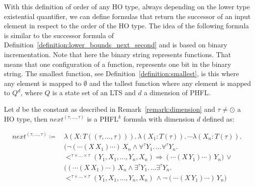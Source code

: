 With this definition of order of any HO type, always depending on the lower type existential quantifier, we can define
formulas that return the successor of an input element in respect to the order of the HO type. The idea of the
following formula is similar to the successor formula of Definition~\ref{definition:lower_bounds_next_second} and is
based on binary incrementation. Note that here the binary string represents functions. That means that one configuration of a function, represents one bit in the binary string. The smallest function, see Definition~\ref{definition:smallest}, is this where any element is mapped to $\emptyset$ and the tallest function where any element is mapped to $Q^d$, where $Q$ is a state set of an LTS and $d$ a dimension of PHFL. 

\begin{definition}
    \label{definition:lower_bounds_next_higher}
    Let $d$ be the constant as described in Remark~\ref{remark:dimension} and $\tau \neq \odot$ a
    HO type, then $next^{(\tau, \dots, \tau)}$ is a PHFL$^k$ formula with dimension $d$ defined as:

    \begin{align*}
        next^{(\tau, \dots, \tau)} \coloneqq &\,\lambda (X \colon T ((\tau, \dots, \tau))).\,\lambda (X_1 \colon T(\tau)).\, \dotsb \lambda (X_n \colon T(\tau)).\, \\&\,
        \big(\neg (\dotsb(X\,X_1)\dotsb)\,X_n \wedge \forall^{\tau}Y_1.\, \dots \forall^{\tau}Y_n.\,\\&\,<^{\tau \times
        \dots \times \tau}(Y_1, X_1, \dots, Y_n, X_n) \Rightarrow  (\dotsb(X\,Y_1)\dotsb)\,Y_n\big) \,\vee
        \\&\,\big((\dotsb (X\,X_1) \dotsb)\,X_n \wedge \exists^{\tau}Y_1.\, \dots \exists^{\tau}Y_n.\, \\&\,
        <^{\tau \times \dots \times \tau}
        (Y_1, X_1, \dots, Y_n, X_n)\,\wedge \neg (\dotsb(X\,Y_1)\dotsb)\,Y_n\big)
    \end{align*}
\end{definition}

